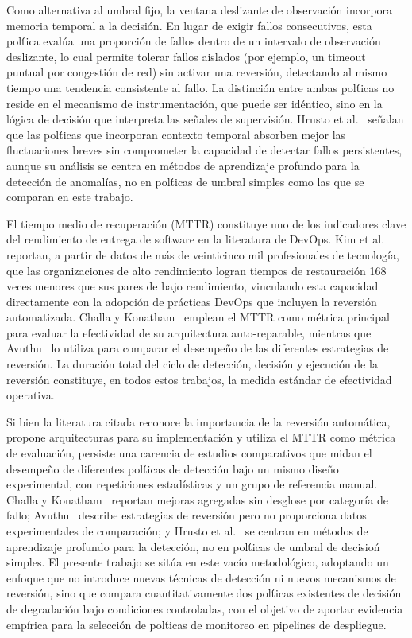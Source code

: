 \documentclass[conference]{IEEEtran}
\begin{document}
Como alternativa al umbral fijo, la ventana deslizante de observaci\'on incorpora memoria temporal a la decisi\'on. En lugar de exigir fallos consecutivos, esta pol\'tica eval\'ua una proporci\'on de fallos dentro de un intervalo de observaci\'on deslizante, lo cual permite tolerar fallos aislados (por ejemplo, un timeout puntual por congesti\'on de red) sin activar una reversi\'on, detectando al mismo tiempo una tendencia consistente al fallo. La distinci\'on entre ambas pol\'ticas no reside en el mecanismo de instrumentaci\'on, que puede ser id\'entico, sino en la l\'ogica de decisi\'on que interpreta las se\~nales de supervisi\'on. Hrusto et al.~\cite{hrusto2022optimization} se\~nalan que las pol\'ticas que incorporan contexto temporal absorben mejor las fluctuaciones breves sin comprometer la capacidad de detectar fallos persistentes, aunque su an\'alisis se centra en m\'etodos de aprendizaje profundo para la detecci\'on de anomal\'ias, no en pol\'ticas de umbral simples como las que se comparan en este trabajo.

El tiempo medio de recuperaci\'on (MTTR) constituye uno de los indicadores clave del rendimiento de entrega de software en la literatura de DevOps. Kim et al.~\cite{kim2016devops} reportan, a partir de datos de m\'as de veinticinco mil profesionales de tecnolog\'ia, que las organizaciones de alto rendimiento logran tiempos de restauraci\'on 168 veces menores que sus pares de bajo rendimiento, vinculando esta capacidad directamente con la adopci\'on de pr\'acticas DevOps que incluyen la reversi\'on automatizada. Challa y Konatham~\cite{challa2024selfhealing} emplean el MTTR como m\'etrica principal para evaluar la efectividad de su arquitectura auto-reparable, mientras que Avuthu~\cite{avuthu2021change} lo utiliza para comparar el desempe\~no de las diferentes estrategias de reversi\'on. La duraci\'on total del ciclo de detecci\'on, decisi\'on y ejecuci\'on de la reversi\'on constituye, en todos estos trabajos, la medida est\'andar de efectividad operativa.

Si bien la literatura citada reconoce la importancia de la reversi\'on autom\'atica, propone arquitecturas para su implementaci\'on y utiliza el MTTR como m\'etrica de evaluaci\'on, persiste una carencia de estudios comparativos que midan el desempe\~no de diferentes pol\'ticas de detecci\'on bajo un mismo dise\~no experimental, con repeticiones estad\'isticas y un grupo de referencia manual. Challa y Konatham~\cite{challa2024selfhealing} reportan mejoras agregadas sin desglose por categor\'ia de fallo; Avuthu~\cite{avuthu2021change} describe estrategias de reversi\'on pero no proporciona datos experimentales de comparaci\'on; y Hrusto et al.~\cite{hrusto2022optimization} se centran en m\'etodos de aprendizaje profundo para la detecci\'on, no en pol\'ticas de umbral de decisio\'n simples. El presente trabajo se sit\'ua en este vac\'io metodol\'ogico, adoptando un enfoque que no introduce nuevas t\'ecnicas de detecci\'on ni nuevos mecanismos de reversi\'on, sino que compara cuantitativamente dos pol\'ticas existentes de decisi\'on de degradaci\'on bajo condiciones controladas, con el objetivo de aportar evidencia emp\'irica para la selecci\'on de pol\'ticas de monitoreo en pipelines de despliegue.
\end{document}
